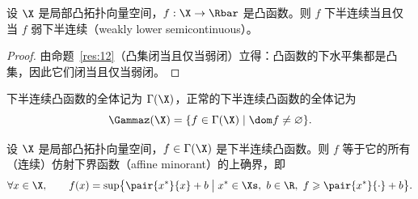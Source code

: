 \begin{proposition}
\label{res:25}
设 $\X$ 是局部凸拓扑向量空间，$f:\X\to\Rbar$ 是凸函数。则 $f$ 下半连续当且仅当 $f$ 弱下半连续（weakly lower semicontinuous）。
\end{proposition}

\begin{proof}
由命题~\ref{res:12}（凸集闭当且仅当弱闭）立得：凸函数的下水平集都是凸集，因此它们闭当且仅当弱闭。
\end{proof}

\begin{definition}[下半连续凸函数类]
\label{def:16}
下半连续凸函数的全体记为 $\Gamma(\X)$，正常的下半连续凸函数的全体记为
\[
  \Gammaz(\X)=\{f\in\Gamma(\X) \mid \dom f\neq\varnothing\}.
\]
\end{definition}

\begin{proposition}
\label{res:26}
设 $\X$ 是局部凸拓扑向量空间，$f\in\Gamma(\X)$ 是下半连续凸函数。则 $f$ 等于它的所有（连续）仿射下界函数（affine minorant）的上确界，即
\[
  \forall x\in\X,\qquad f(x)=\sup\bigl\{\pair{x^*}{x}+b \bigm| x^*\in\Xs,\ b\in\R,\ f\geqslant\pair{x^*}{\cdot}+b\bigr\}.
\]
\end{proposition}


